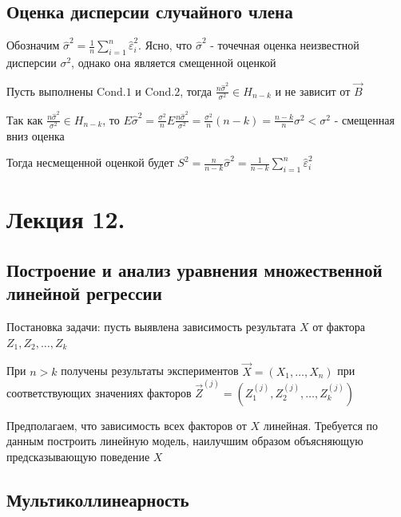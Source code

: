 \documentclass[12pt]{article}
\begin{document}
\subsection{Оценка дисперсии случайного члена}

Обозначим $\hat \sigma^2 = \frac{1}{n} \sum_{i = 1}^n \hat \varepsilon^2_i$. Ясно, что $\hat \sigma^2$ - точечная оценка 
неизвестной дисперсии $\sigma^2$, однако она является смещенной оценкой

\begin{MyTheorem}
    Пусть выполнены $\mathrm{Cond. 1}$ и $\mathrm{Cond. 2}$, тогда $\frac{n \hat \sigma^2}{\sigma^2} \in H_{n - k}$ и не зависит от $\vec B$
\end{MyTheorem}

Так как $\frac{n \hat \sigma^2}{\sigma^2} \in H_{n - k}$, то $E \hat \sigma^2 = \frac{\sigma^2}{n} E \frac{n \hat \sigma^2}{\sigma^2} = \frac{\sigma^2}{n} (n - k) = \frac{n - k}{n} \sigma^2 < \sigma^2$ - смещенная вниз оценка

Тогда несмещенной оценкой будет $S^2 = \frac{n}{n - k} \hat \sigma^2 = \frac{1}{n - k} \sum_{i = 1}^n \hat \varepsilon_i^2$










\section{Лекция 12.}

\subsection{Построение и анализ уравнения множественной линейной регрессии}

Постановка задачи: пусть выявлена зависимость результата $X$ от фактора $Z_1, Z_2, \dots, Z_k$

При $n > k$ получены результаты экспериментов $\vec X = (X_1, \dots, X_n)$ при соответствующих значениях факторов $\vec Z^{(j)} = (Z^{(j)}_1, Z^{(j)}_2, \dots, Z^{(j)}_k)$

Предполагаем, что зависимость всех факторов от $X$ линейная. Требуется по данным построить линейную модель, наилучшим образом объясняющую предсказывающую поведение $X$

\subsection{Мультиколлинеарность}
\end{document}
